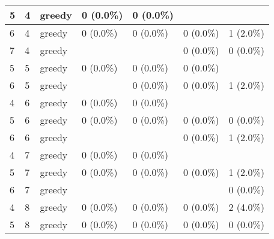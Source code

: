 \documentclass[oneside,canadian,landscape]{article}
\begin{document}
\begin{center}
\begin{longtable}{|l|l|l||l|l|l|l|}
5&4&greedy&0 (0.0\%)&0 (0.0\%)&&\\ \hline
6&4&greedy&0 (0.0\%)&0 (0.0\%)&0 (0.0\%)&1 (2.0\%)\\ \hline
7&4&greedy&&&0 (0.0\%)&0 (0.0\%)\\ \hline
5&5&greedy&0 (0.0\%)&0 (0.0\%)&0 (0.0\%)&\\ \hline
6&5&greedy&&0 (0.0\%)&0 (0.0\%)&1 (2.0\%)\\ \hline
4&6&greedy&0 (0.0\%)&0 (0.0\%)&&\\ \hline
5&6&greedy&0 (0.0\%)&0 (0.0\%)&0 (0.0\%)&0 (0.0\%)\\ \hline
6&6&greedy&&&0 (0.0\%)&1 (2.0\%)\\ \hline
4&7&greedy&0 (0.0\%)&0 (0.0\%)&&\\ \hline
5&7&greedy&0 (0.0\%)&0 (0.0\%)&0 (0.0\%)&1 (2.0\%)\\ \hline
6&7&greedy&&&&0 (0.0\%)\\ \hline
4&8&greedy&0 (0.0\%)&0 (0.0\%)&0 (0.0\%)&2 (4.0\%)\\ \hline
5&8&greedy&0 (0.0\%)&0 (0.0\%)&0 (0.0\%)&0 (0.0\%)\\ \hline
\end{longtable}
\end{center}
\end{document}
